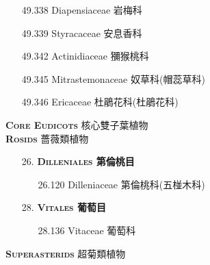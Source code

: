 \begin{enumerate}
\begin{enumerate}
        
      \item[49.338] Diapensiaceae 岩梅科     
        
      \item[49.339] Styracaceae 安息香科     
        
      \item[49.342] Actinidiaceae 獼猴桃科     
        
      \item[49.345] Mitrastemonaceae 奴草科(帽蕊草科)     
        
      \item[49.346] Ericaceae 杜鵑花科(杜鵑花科)     
        
    \end{enumerate}
\end{enumerate}
\vspace{2ex} 
\noindent \normalsize\textsc{\textbf{Core Eudicots} 核心雙子葉植物}\selectfont \\
\footnotesize\selectfont
\vspace{2ex} 
\noindent \normalsize\textsc{\textbf{Rosids} 薔薇類植物}\selectfont \\
\footnotesize\selectfont
\begin{enumerate}
  \item[26. ] \textbf{\textsc{Dilleniales} 第倫桃目}   
    \begin{enumerate}
      \item[26.120] Dilleniaceae 第倫桃科(五椪木科)     
    \end{enumerate}
  \item[28. ] \textbf{\textsc{Vitales} 葡萄目}   
    \begin{enumerate}
      \item[28.136] Vitaceae 葡萄科     
        
    \end{enumerate}
\end{enumerate}
\vspace{2ex} 
\noindent \normalsize\textsc{\textbf{Superasterids} 超菊類植物}\selectfont \\
\footnotesize\selectfont
